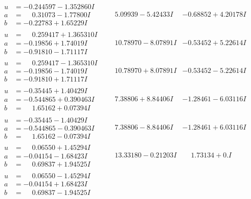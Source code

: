 \documentclass[1p]{elsarticle_modified}
\theoremstyle{definition}
\begin{document}
$$\begin{array}{c|c|c}
\begin{aligned}
u &= -0.244597 - 1.352860 I \\
a &= \phantom{-}0.31073 - 1.77800 I \\
b &= -0.22783 + 1.65229 I\end{aligned}
 & \phantom{-}5.09939 - 5.42433 I & -0.68852 + 4.20178 I \\ \hline\begin{aligned}
u &= \phantom{-}0.259417 + 1.365310 I \\
a &= -0.19856 + 1.74019 I \\
b &= -0.91810 - 1.71117 I\end{aligned}
 & \phantom{-}10.78970 - 8.07891 I & -0.53452 + 5.22614 I \\ \hline\begin{aligned}
u &= \phantom{-}0.259417 - 1.365310 I \\
a &= -0.19856 - 1.74019 I \\
b &= -0.91810 + 1.71117 I\end{aligned}
 & \phantom{-}10.78970 + 8.07891 I & -0.53452 - 5.22614 I \\ \hline\begin{aligned}
u &= -0.35445 + 1.40429 I \\
a &= -0.544865 + 0.390463 I \\
b &= \phantom{-}1.65162 + 0.07394 I\end{aligned}
 & \phantom{-}7.38806 + 8.84406 I & -1.28461 - 6.03116 I \\ \hline\begin{aligned}
u &= -0.35445 - 1.40429 I \\
a &= -0.544865 - 0.390463 I \\
b &= \phantom{-}1.65162 - 0.07394 I\end{aligned}
 & \phantom{-}7.38806 - 8.84406 I & -1.28461 + 6.03116 I \\ \hline\begin{aligned}
u &= \phantom{-}0.06550 + 1.45294 I \\
a &= -0.04154 - 1.68423 I \\
b &= \phantom{-}0.69837 + 1.94525 I\end{aligned}
 & \phantom{-}13.33180 - 0.21203 I & \phantom{-}1.73134 + 0. I\phantom{ +0.000000I} \\ \hline\begin{aligned}
u &= \phantom{-}0.06550 - 1.45294 I \\
a &= -0.04154 + 1.68423 I \\
b &= \phantom{-}0.69837 - 1.94525 I\end{aligned}

\end{array}$$
\end{document}
